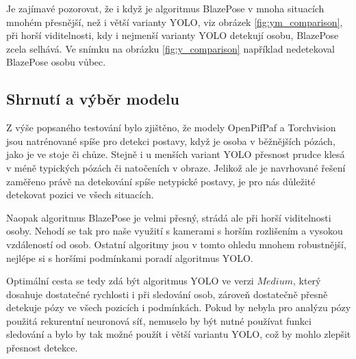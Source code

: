 Je zajímavé pozorovat, že i když je algoritmus BlazePose v mnoha situacích
mnohém přesnější, než i větší varianty YOLO, viz obrázek
\ref{fig:ym_comparison}, při horší viditelnosti, kdy i nejmenší varianty YOLO
detekují osobu, BlazePose zcela selhává. Ve snímku na obrázku
\ref{fig:y_comparison} například nedetekoval BlazePose osobu vůbec.

\subsection{Shrnutí a výběr modelu}

Z výše popsaného testování bylo zjištěno, že modely OpenPifPaf a Torchvision
jsou natrénované spíše pro detekci postavy, když je osoba v běžnějších pózách,
jako je ve stoje či chůze. Stejně i u menších variant YOLO přesnost prudce
klesá v méně typických pózách či natočeních v obraze. Jelikož ale je navrhované řešení zaměřeno právě na detekování spíše netypické postavy, je pro nás důležité
detekovat pozici ve všech situacích.

Naopak algoritmus BlazePose je velmi přesný, strádá ale při horší viditelnosti
osoby. Nehodí se tak pro naše využití s kamerami s horším rozlišením a vysokou
vzdáleností od osob. Ostatní algoritmy jsou v tomto ohledu mnohem robustnější,
nejlépe si s horšími podmínkami poradí algoritmus YOLO.

Optimální cesta se tedy zdá být algoritmus YOLO ve verzi $Medium$, který dosahuje
dostatečné rychlosti i při sledování osob, zároveň dostatečně přesně detekuje
pózy ve všech pozicích i podmínkách. Pokud by nebyla pro analýzu pózy použitá
rekurentní neuronová síť, nemuselo by být nutné používat funkci sledování a
bylo by tak možné použít i větší variantu YOLO, což by mohlo zlepšit přesnost
detekce.

\endinput